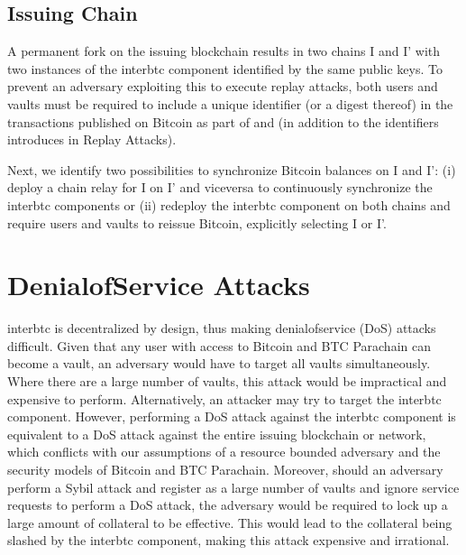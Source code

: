 \documentclass[a4paper,10pt,english]{sphinxmanual}
\begin{document}
\subsection{Issuing Chain}
\label{\detokenize{security_performance/security-analysis:issuing-chain}}
A permanent fork on the issuing blockchain results in two chains I and I’ with two instances of the interbtc component identified by the same public keys. To prevent an adversary exploiting this to execute replay attacks, both users and vaults must be required to include a unique identifier (or a digest thereof) in the transactions published on Bitcoin as part of {\hyperref[\detokenize{spec/issue:issue-protocol}]{}} and {\hyperref[\detokenize{spec/redeem:redeem-protocol}]{}} (in addition to the identifiers introduces in Replay Attacks).

Next, we identify two possibilities to synchronize Bitcoin balances on I and I’: (i) deploy a chain relay for I on I’ and vice\sphinxhyphen{}versa to continuously synchronize the interbtc components or (ii) redeploy the interbtc component on both chains and require users and vaults to re\sphinxhyphen{}issue Bitcoin, explicitly selecting I or I’.


\section{Denial\sphinxhyphen{}of\sphinxhyphen{}Service Attacks}
\label{\detokenize{security_performance/security-analysis:denial-of-service-attacks}}
interbtc is decentralized by design, thus making denial\sphinxhyphen{}of\sphinxhyphen{}service (DoS) attacks difficult. Given that any user with access to Bitcoin and BTC Parachain can become a vault, an adversary would have to target all vaults simultaneously. Where there are a large number of vaults, this attack would be impractical and expensive to perform. Alternatively, an attacker may try to target the interbtc component. However, performing a DoS attack against the interbtc component is equivalent to a DoS attack against the entire issuing blockchain or network, which conflicts with our assumptions of a resource bounded adversary and the security models of Bitcoin and BTC Parachain. Moreover, should an adversary perform a Sybil attack and register as a large number of vaults and ignore service requests to perform a DoS attack, the adversary would be required to lock up a large amount of collateral to be effective. This would lead to the collateral being slashed by the interbtc component, making this attack expensive and irrational.
\end{document}
